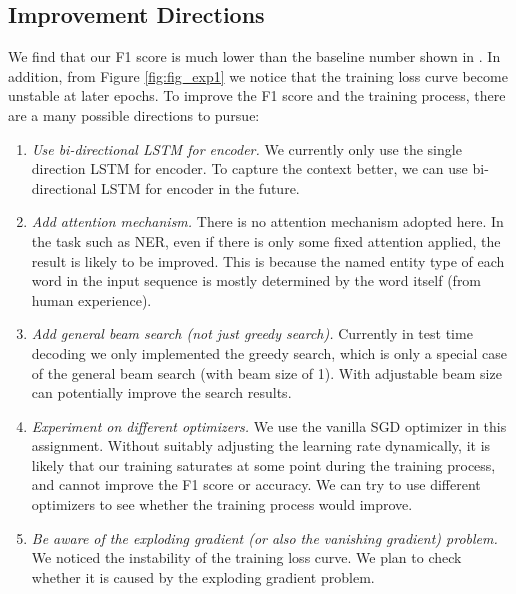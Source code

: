 \documentclass[11pt,a4paper]{article}
\begin{document}
\subsection{Improvement Directions}
\label{ssec:Improvement}

We find that our F1 score is much lower than the baseline number shown in \citet{goyal2018continuous}. In addition, from Figure \ref{fig:fig_exp1} we notice that the training loss curve become unstable at later epochs. To improve the F1 score and the training process, there are a many possible directions to pursue:

\begin{enumerate}
	\item \emph{Use bi-directional LSTM for encoder.} We currently only use the single direction LSTM for encoder. To capture the context better, we can use bi-directional LSTM for encoder in the future.
    \item \emph{Add attention mechanism.} There is no attention mechanism adopted here. In the task such as NER, even if there is only some fixed attention applied, the result is likely to be improved. This is because the named entity type of each word in the input sequence is mostly determined by the word itself (from human experience).
    \item \emph{Add general beam search (not just greedy search).} Currently in test time decoding we only implemented the greedy search, which is only a special case of the general beam search (with beam size of 1). With adjustable beam size can potentially improve the search results.
    \item \emph{Experiment on different optimizers.} We use the vanilla SGD optimizer in this assignment. Without suitably adjusting the learning rate dynamically, it is likely that our training saturates at some point during the training process, and cannot improve the F1 score or accuracy. We can try to use different optimizers to see whether the training process would improve.
    \item \emph{Be aware of the exploding gradient (or also the vanishing gradient) problem.} We noticed the instability of the training loss curve. We plan to check whether it is caused by the exploding gradient problem.
\end{enumerate}



\end{document}
